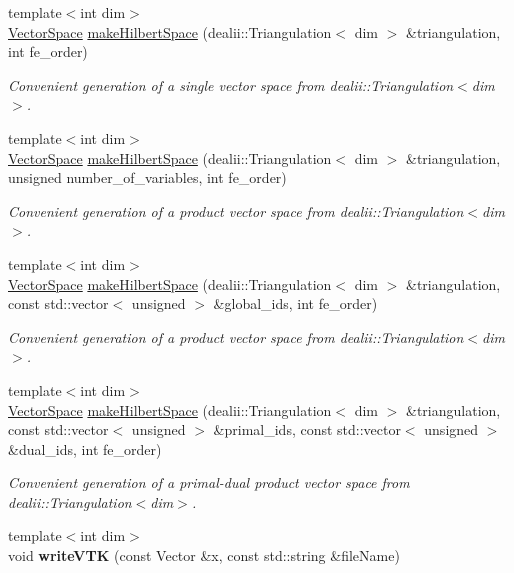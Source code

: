 \begin{DoxyCompactItemize}
\item 
{\footnotesize template$<$int dim$>$ }\\\hyperlink{classSpacy_1_1VectorSpace}{\-Vector\-Space} \hyperlink{namespaceSpacy_1_1dealII_a5b48ceb52102e7accfc4b65af09380c6}{make\-Hilbert\-Space} (dealii\-::\-Triangulation$<$ dim $>$ \&triangulation, int fe\-\_\-order)
\begin{DoxyCompactList}\small\item\em \-Convenient generation of a single vector space from dealii\-::\-Triangulation$<$dim$>$. \end{DoxyCompactList}\item 
{\footnotesize template$<$int dim$>$ }\\\hyperlink{classSpacy_1_1VectorSpace}{\-Vector\-Space} \hyperlink{namespaceSpacy_1_1dealII_aa041de042d8014c090d2a4b22ef94c46}{make\-Hilbert\-Space} (dealii\-::\-Triangulation$<$ dim $>$ \&triangulation, unsigned number\-\_\-of\-\_\-variables, int fe\-\_\-order)
\begin{DoxyCompactList}\small\item\em \-Convenient generation of a product vector space from dealii\-::\-Triangulation$<$dim$>$. \end{DoxyCompactList}\item 
{\footnotesize template$<$int dim$>$ }\\\hyperlink{classSpacy_1_1VectorSpace}{\-Vector\-Space} \hyperlink{namespaceSpacy_1_1dealII_a1908af839cb23b2f8f6c85a641c6e578}{make\-Hilbert\-Space} (dealii\-::\-Triangulation$<$ dim $>$ \&triangulation, const std\-::vector$<$ unsigned $>$ \&global\-\_\-ids, int fe\-\_\-order)
\begin{DoxyCompactList}\small\item\em \-Convenient generation of a product vector space from dealii\-::\-Triangulation$<$dim$>$. \end{DoxyCompactList}\item 
{\footnotesize template$<$int dim$>$ }\\\hyperlink{classSpacy_1_1VectorSpace}{\-Vector\-Space} \hyperlink{namespaceSpacy_1_1dealII_a87a3912bf438b7739b7e59a5f4f03dd9}{make\-Hilbert\-Space} (dealii\-::\-Triangulation$<$ dim $>$ \&triangulation, const std\-::vector$<$ unsigned $>$ \&primal\-\_\-ids, const std\-::vector$<$ unsigned $>$ \&dual\-\_\-ids, int fe\-\_\-order)
\begin{DoxyCompactList}\small\item\em \-Convenient generation of a primal-\/dual product vector space from dealii\-::\-Triangulation$<$dim$>$. \end{DoxyCompactList}\item 
\hypertarget{namespaceSpacy_1_1dealII_a34ae531adba4232c22eac3ff6dc417e2}{{\footnotesize template$<$int dim$>$ }\\void {\bfseries write\-V\-T\-K} (const \-Vector \&x, const std\-::string \&file\-Name)}\label{namespaceSpacy_1_1dealII_a34ae531adba4232c22eac3ff6dc417e2}

\end{DoxyCompactItemize}


